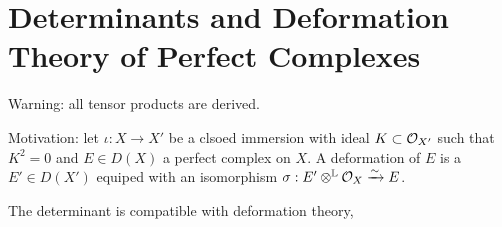 \documentclass[12pt]{article}
\begin{document}
\section{Determinants and Deformation Theory of Perfect Complexes}

Warning: all tensor products are derived.

Motivation: let $\iota : X \to X'$ be a clsoed immersion with ideal $K \subset \mathcal{O}_{X'}$ such that $K^2 = 0$ and $E \in D(X)$ a perfect complex on $X$. A deformation of $E$ is a $E' \in D(X')$ equiped with an isomorphism $\sigma : E' \otimes^{\mathbb{L}} \mathcal{O}_{X} \xrightarrow{\sim} E$.

\begin{thm}

\end{thm}

\begin{thm}
The determinant is compatible with deformation theory,
\begin{enumerate}
\item $\tr{\omega(E)) = \omega(\det{E})$
\item $(E', \sigma)$ and $\alpha \in \Ext{1}{}{E}{E \otimes K}$
\end{enumerate}
\end{thm}
\end{document}
